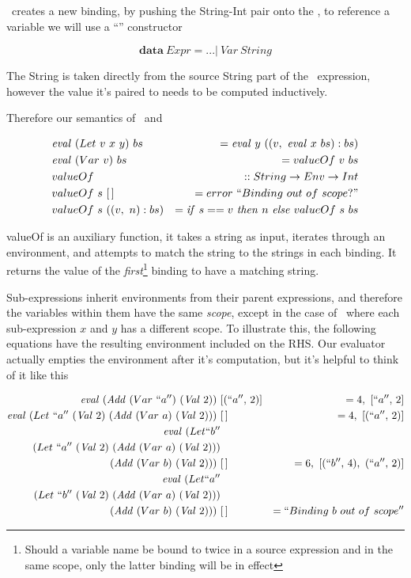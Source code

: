 \documentclass {article}
\begin{document}
\leet\ creates a new binding,
by pushing the String-Int pair
onto the \env, to reference a variable we will
use a ``\var'' constructor

\[ \textbf{data}\ Expr = ... |\ Var\ String \]

The String is taken directly from the source
String part of the \leet\ expression,
however the value it's paired to 
needs to be computed inductively.

Therefore our semantics of \leet\ and \var\

\begin{eqnarray*}
&\evalf  (Let\ v\ x\ y)\ bs &= \evalf  y\ ((v,\ \evalf  x\ bs):bs) \\
&\evalf  (Var\ v)\ bs		    &=   valueOf\ v\ bs  \\
&valueOf\ &:: String \rightarrow Env \rightarrow Int \\
&valueOf\ s\ [\, ]\ &= error\ ``Binding\ out\ of\ scope?" \\
&valueOf\ s\ ((v,\ n):bs) &= \ifff s == v\ \tthen n\ \eelse valueOf\ s\ bs
\end{eqnarray*}

valueOf is an auxiliary function,
it takes a string as input, iterates through an
environment, and attempts to match
the string to the strings in each binding.
It returns the value of the \emph{first}\footnote{
Should a variable name be bound to twice in a 
source expression and in the same scope,
only the latter binding will
be in effect} binding
to have a matching string. 
\linebreak

Sub-expressions inherit environments from their parent expressions,
and therefore the variables within them have the same \emph{scope},
except in the case of \leet\ where each sub-expression $x$ and $y$
has a different scope. 
To illustrate this, the following equations
have the resulting environment included on the RHS.
Our evaluator actually empties the environment 
after it's computation, 
but it's helpful to think of it like this

\begin{align}
\mathit{eval\ }  (\mathit{Add\ } (Var\ ``a'')\ (\mathit{Val\ } 2))\ &[(``a'',\, 2)] 
			&= 4,\ [``a'',\, 2] \nonumber \\
\mathit{eval\ }  (Let\ ``a''\ (\mathit{Val\ } 2)\ (\mathit{Add\ } (Var\ a)\ (\mathit{Val\ } 2))  )\ &[\, ] 
		&= 4,\ [(``a'',\, 2)] \nonumber \\ 
\mathit{eval\ }  (Let ``b'' \nonumber \\
		(Let\ ``a''\ (\mathit{Val\ } 2) \
			 (\mathit{Add\ } (Var\ a)\ (\mathit{Val\ } 2))  ) \nonumber \\
		(\mathit{Add\ } (Var\ b)\ (\mathit{Val\ } 2)))\ &[\, ] 
		&= 6,\ [(``b'',\, 4),\ (``a'',\, 2)] \label{egletlet1} \\ 
\mathit{eval\ }  (Let ``a'' \nonumber \\
		(Let\ ``b''\ (\mathit{Val\ } 2) \
			 (\mathit{Add\ } (Var\ a)\ (\mathit{Val\ } 2))  ) \nonumber \\
		(\mathit{Add\ } (Var\ b)\ (\mathit{Val\ } 2)))\ &[\, ] 
		&= ``Binding\ b\ out\ of\ scope'' \label{egletlet2} \nonumber \\
\end{align}
\end{document}
